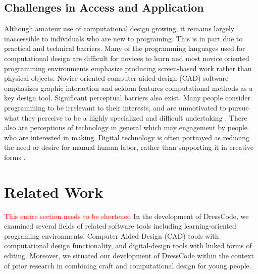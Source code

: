 \documentclass{sigchi}
\begin{document}
\subsection{Challenges in Access and Application}
Although amateur use of computational design growing, it remains largely inaccessible to individuals who are new to programing. This is in part due to practical and technical barriers. Many of the programming languages used for computational design are difficult for novices to learn and most novice oriented programming environments emphasize producing screen-based work rather than physical objects. Novice-oriented computer-aided-design (CAD) software emphasizes graphic interaction and seldom features computational methods as a key design tool. Significant perceptual barriers also exist. Many people consider programming to be irrelevant to their interests, and are unmotivated to pursue what they perceive to be a highly specialized and difficult undertaking \cite{resnick1}. There also are perceptions of technology in general which may engagement by people who are interested in making. Digital technology is often portrayed as reducing the need or desire for manual human labor, rather than supporting it in creative forms \cite{rosner_craft_vs_design}.

\section{Related Work}
\textcolor{red}{This entire section needs to be shortened}
In the development of DressCode, we examined several fields of related software tools including learning-oriented programing environments, Computer Aided Design (CAD) tools with computational design functionality, and digital-design tools with linked forms of editing. Moreover, we situated our development of DressCode within the context of prior research in combining craft and computational design for young people.
\end{document}
